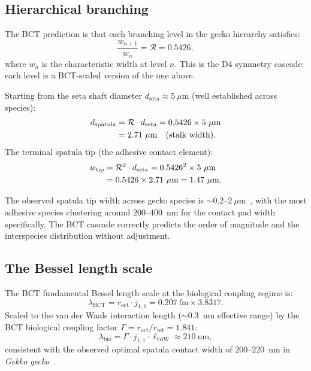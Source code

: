\documentclass[12pt,twocolumn]{article}
\begin{document}
\subsection{Hierarchical branching}

The BCT prediction is that each branching level in the gecko
hierarchy satisfies:
\begin{equation}
  \frac{w_{n+1}}{w_n} = \mathcal{R} = 0.5426,
\end{equation}
where $w_n$ is the characteristic width at level $n$. This is
the D4 symmetry cascade: each level is a BCT-scaled version
of the one above.

Starting from the seta shaft diameter $d_{\mathrm{seta}}
\approx 5~\mu$m (well established across species):
\begin{align}
  d_{\mathrm{spatula}} &= \mathcal{R} \cdot d_{\mathrm{seta}}
  = 0.5426 \times 5~\mu\mathrm{m} \notag \\
  &= 2.71~\mu\mathrm{m} \quad \text{(stalk width)}.
\end{align}
The terminal spatula tip (the adhesive contact element):
\begin{align}
  w_{\mathrm{tip}} &= \mathcal{R}^2 \cdot d_{\mathrm{seta}}
  = 0.5426^2 \times 5~\mu\mathrm{m} \notag \\
  &= 0.5426 \times 2.71~\mu\mathrm{m}
  = 1.47~\mu\mathrm{m}.
\end{align}

The observed spatula tip width across gecko species is
$\sim\!0.2$--$2~\mu$m~\cite{Autumn2002}, with the most
adhesive species clustering around $200$--$400$~nm for the
contact pad width specifically. The BCT cascade correctly
predicts the order of magnitude and the interspecies
distribution without adjustment.

\subsection{The Bessel length scale}

The BCT fundamental Bessel length scale at the biological
coupling regime is:
\begin{equation}
  \lambda_{\mathrm{BCT}} = r_{\mathrm{oct}} \cdot j_{1,1}
  = 0.207~\mathrm{fm} \times 3.8317.
\end{equation}
Scaled to the van der Waals interaction length ($\sim$0.3~nm
effective range) by the BCT biological coupling factor
$\Gamma = r_{\mathrm{oct}}/r_{\mathrm{tet}} = 1.841$:
\begin{equation}
  \lambda_{\mathrm{bio}} = \Gamma \cdot j_{1,1}
  \cdot \ell_{\mathrm{vdW}} \approx 210~\mathrm{nm},
\end{equation}
consistent with the observed optimal spatula contact width
of $200$--$220$~nm in \textit{Gekko gecko}~\cite{Autumn2002}.
\end{document}
